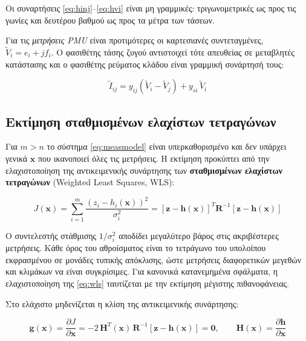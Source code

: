 Οι συναρτήσεις \eqref{eq:hinj}--\eqref{eq:hvi} είναι μη γραμμικές: τριγωνομετρικές ως προς τις
γωνίες και δευτέρου βαθμού ως προς τα μέτρα των τάσεων. 

Για τις \emph{μετρήσεις PMU} είναι προτιμότερες οι καρτεσιανές συντεταγμένες,
$\tilde{V}_i = e_i + j f_i$. Ο φασιθέτης τάσης ζυγού αντιστοιχεί τότε απευθείας σε μεταβλητές
κατάστασης και ο φασιθέτης ρεύματος κλάδου είναι γραμμική συνάρτησή τους:

\begin{equation}
\tilde{I}_{ij} = y_{ij}\left(\tilde{V}_i - \tilde{V}_j\right) + y_{si}\,\tilde{V}_i
\label{eq:hpmu}
\end{equation}

\subsection{Εκτίμηση σταθμισμένων ελαχίστων τετραγώνων}
\label{sec:wls}

Για $m > n$ το σύστημα \eqref{eq:measmodel} είναι υπερκαθορισμένο και δεν υπάρχει γενικά
$\mathbf{x}$ που ικανοποιεί όλες τις μετρήσεις. Η εκτίμηση προκύπτει από την ελαχιστοποίηση της
αντικειμενικής συνάρτησης των \textbf{σταθμισμένων ελαχίστων τετραγώνων} (Weighted Least
Squares, WLS):

\begin{equation}
J(\mathbf{x}) = \sum_{i=1}^{m} \frac{\left(z_i - h_i(\mathbf{x})\right)^2}{\sigma_i^2}
             = \left[\mathbf{z}-\mathbf{h}(\mathbf{x})\right]^{T} \mathbf{R}^{-1}
               \left[\mathbf{z}-\mathbf{h}(\mathbf{x})\right]
\label{eq:wls}
\end{equation}

Ο συντελεστής στάθμισης $1/\sigma_i^2$ αποδίδει μεγαλύτερο βάρος στις ακριβέστερες μετρήσεις.
Κάθε όρος του αθροίσματος είναι το τετράγωνο του υπολοίπου εκφρασμένου σε μονάδες τυπικής
απόκλισης, ώστε μετρήσεις διαφορετικών μεγεθών και κλιμάκων να είναι συγκρίσιμες. Για
κανονικά κατανεμημένα σφάλματα, η ελαχιστοποίηση της \eqref{eq:wls} ταυτίζεται με την
εκτίμηση μέγιστης πιθανοφάνειας.

Στο ελάχιστο μηδενίζεται η κλίση της αντικειμενικής συνάρτησης:

\begin{equation}
\mathbf{g}(\mathbf{x}) = \frac{\partial J}{\partial \mathbf{x}}
  = -2\,\mathbf{H}^{T}(\mathbf{x})\,\mathbf{R}^{-1}\left[\mathbf{z} - \mathbf{h}(\mathbf{x})\right]
  = \mathbf{0}, \qquad
\mathbf{H}(\mathbf{x}) = \frac{\partial \mathbf{h}}{\partial \mathbf{x}}
\label{eq:foc}
\end{equation}

